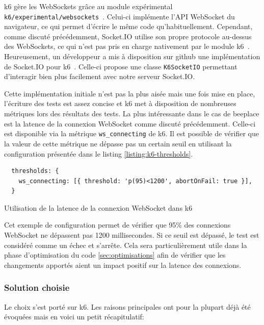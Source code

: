 k6 gère les WebSockets grâce au module expérimental \texttt{k6/experimental/websockets}~\cite{k6-websockets}. Celui-ci implémente l'API WebSocket du navigateur, ce qui permet d'écrire le même code qu'habituellement. Cependant, comme discuté précédemment, Socket.IO utilise son propre protocole au-dessus des WebSockets, ce qui n'est pas pris en charge nativement par le module k6~\cite{k6-socket-io-issue}. Heureusement, un développeur a mis à disposition sur \gls{github} une implémentation de Socket.IO pour k6~\cite{k6-socket-io}. Celle-ci propose une classe \texttt{K6SocketIO} permettant d'interagir bien plus facilement avec notre serveur Socket.IO.

Cette implémentation initiale n'est pas la plus aisée mais une fois mise en place, l'écriture des tests est assez concise et k6 met à disposition de nombreuses métriques lors des résultats des tests. La plus intéressante dans le cas de \gls{beeplace} est la latence de la connexion WebSocket comme discuté précédemment. Celle-ci est disponible via la métrique \texttt{ws_connecting} de k6. Il est possible de vérifier que la valeur de cette métrique ne dépasse pas un certain seuil en utilisant la configuration présentée dans le listing \ref{listing:k6-thresholds}.

\begin{listing}[H]
  \begin{verbatim}
  thresholds: {
    ws_connecting: [{ threshold: 'p(95)<1200', abortOnFail: true }],
  }
\end{verbatim}
  \caption{Utilisation de la latence de la connexion WebSocket dans k6}
  \label{listing:k6-thresholds}
\end{listing}

Cet exemple de configuration permet de vérifier que 95\% des connexions WebSocket ne dépassent pas 1200 millisecondes. Si ce seuil est dépassé, le test est considéré comme un échec et s'arrête. Cela sera particulièrement utile dans la phase d'optimisation du code \ref{sec:optimisations} afin de vérifier que les changements apportés aient un impact positif sur la latence des connexions.

\subsubsection{Solution choisie}

Le choix s'est porté sur k6. Les raisons principales ont pour la plupart déjà été évoquées mais en voici un petit récapitulatif:

